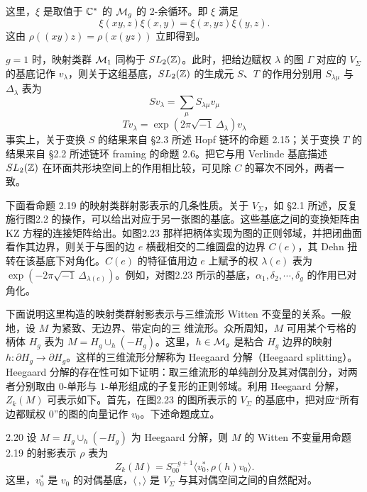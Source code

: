 这里，$\xi$ 是取值于 $\mathbb{C}^*$ 的 $\mathcal{M}_g$ 的 2-余循环。即 $\xi$ 满足
\[
  \xi(xy,z)\xi(x,y)=\xi(x,yz)\xi(y,z).
\]
这由 $\rho((xy)z)=\rho(x(yz))$ 立即得到。

$g=1$ 时，映射类群 $\mathcal{M}_1$ 同构于 $SL_2(\mathbb{Z})$。此时，把给边赋权 $\lambda$ 的图 $\Gamma$ 对应的 $V_\Sigma$ 的基底记作 $v_\lambda$，则关于这组基底，$SL_2(\mathbb{Z})$ 的生成元 $S$、$T$ 的作用分别用 $S_{\lambda\mu}$ 与 $\Delta_\lambda$ 表为
\begin{equation}
  Sv_\lambda=\sum_{\mu}S_{\lambda\mu}v_\mu \tag{2.28}
\end{equation}
\begin{equation}
  Tv_\lambda=\exp(2\pi\sqrt{-1}\,\Delta_\lambda)v_\lambda \tag{2.29}
\end{equation}
事实上，关于变换 $S$ 的结果来自 §2.3 所述 Hopf 链环的命题 2.15；关于变换 $T$ 的结果来自 §2.2 所述链环 framing 的命题 2.6。把它与用 Verlinde 基底描述 $SL_2(\mathbb{Z})$ 在环面共形块空间上的作用相比较，可见除 $C$ 的幂次不同外，两者一致。

下面看命题 2.19 的映射类群射影表示的几条性质。关于 $V_\Sigma$，如 §2.1 所述，反复施行图2.2 的操作，可以给出对应于另一张图的基底。这些基底之间的变换矩阵由 KZ 方程的连接矩阵给出。如图2.23 那样把柄体实现为图的正则邻域，并把闭曲面看作其边界，则关于与图的边 $e$ 横截相交的二维圆盘的边界 $C(e)$，其 Dehn 扭转在该基底下对角化。$C(e)$ 的特征值用边 $e$ 上赋予的权 $\lambda(e)$ 表为 $\exp(-2\pi\sqrt{-1}\,\Delta_{\lambda(e)})$。例如，对图2.23 所示的基底，$\alpha_1,\delta_2,\cdots,\delta_g$ 的作用已对角化。

下面说明这里构造的映射类群射影表示与三维流形 Witten 不变量的关系。一般地，设 $M$ 为紧致、无边界、带定向的三
维流形。众所周知，$M$ 可用某个亏格的柄体 $H_g$ 表为 $M=H_g\cup_h(-H_g)$。这里，$h\in\mathcal{M}_g$ 是粘合 $H_g$ 边界的映射 $h:\partial H_g\to\partial H_g$。这样的三维流形分解称为 Heegaard 分解（Heegaard splitting）。Heegaard 分解的存在性可如下证明：取三维流形的单纯剖分及其对偶剖分，对两者分别取由 $0$-单形与 $1$-单形组成的子复形的正则邻域。利用 Heegaard 分解，$Z_k(M)$ 可表示如下。首先，在图2.23 的图所表示的 $V_\Sigma$ 的基底中，把对应“所有边都赋权 $0$”的图的向量记作 $v_0$。下述命题成立。

\begin{proposition}{2.20}
  设 $M=H_g\cup_h(-H_g)$ 为 Heegaard 分解，则 $M$ 的 Witten 不变量用命题 2.19 的射影表示 $\rho$ 表为
  \[
    Z_k(M)=S_{00}^{-g+1}\langle v_0^*,\rho(h)v_0\rangle.
  \]
  这里，$v_0^*$ 是 $v_0$ 的对偶基底，$\langle\,,\rangle$ 是 $V_\Sigma$ 与其对偶空间之间的自然配对。
\end{proposition}

